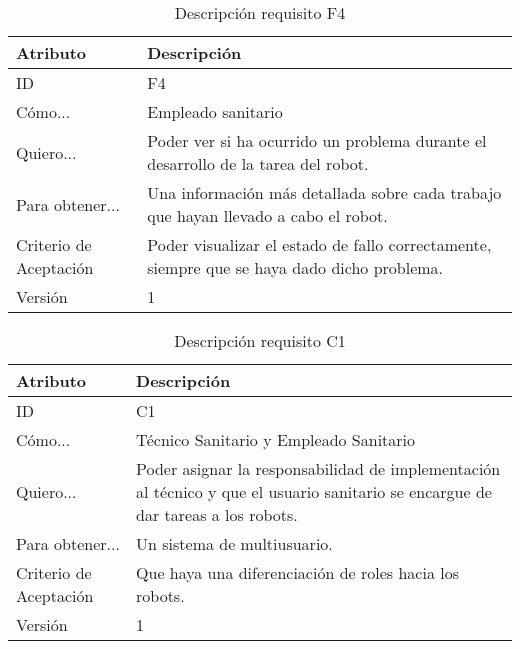 \begin{table}[H]
    \label{tab:reqF4}
 	\caption{Descripción requisito F4}
	\centering
	
	\begin{tabular}{C{3cm}|C{12cm}}
 		\toprule
 		\textbf{Atributo} & \textbf{Descripción} \\
 		\midrule
 	    ID & F4 \\
 	    Cómo... & Empleado sanitario \\
 	    Quiero... & Poder ver si ha ocurrido un problema durante el desarrollo de la tarea del robot.\\
 	    Para obtener... & Una información más detallada sobre cada trabajo que hayan llevado a cabo el robot.  \\
 	    Criterio de Aceptación & Poder visualizar el estado de fallo correctamente, siempre que se haya dado dicho problema. \\
 	    Versión & 1 \\
 		\bottomrule
 		\end{tabular}
\end{table}



\begin{table}[H]
    \label{tab:reqC1}
 	\caption{Descripción requisito C1}
	\centering
	
	\begin{tabular}{C{3cm}|C{12cm}}
 		\toprule
 		\textbf{Atributo} & \textbf{Descripción} \\
 		\midrule
 	    ID & C1 \\
 	    Cómo... & Técnico Sanitario y Empleado Sanitario \\
 	    Quiero... & Poder asignar la responsabilidad de implementación al técnico y que el usuario sanitario se encargue de dar tareas a los robots. \\
 	    Para obtener... & Un sistema de multiusuario.  \\
 	    Criterio de Aceptación & Que haya una diferenciación de roles hacia los robots. \\
 	    Versión & 1 \\
 		\bottomrule
 		\end{tabular}
\end{table}

